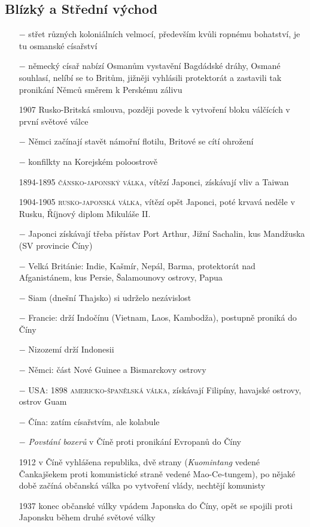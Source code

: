 \documentclass{article}
\begin{document}
\subsection*{Blízký a Střední východ}
\begin{itemize}
    \vspace{-0.5em}
    \setlength\itemsep{0.15em}
    \item[$-$] střet různých koloniálních velmocí, především kvůli ropnému bohatství, je tu osmanské císařství
    \item[$-$] německý císař nabízí Osmanům vystavění Bagdádské dráhy, Osmané souhlasí, nelíbí se to Britům, jižněji vyhlásili protektorát a zastavili tak pronikání Němců směrem k Perskému zálivu
    \item[1907] Rusko-Britská smlouva, později povede k vytvoření bloku válčících v první světové válce
    \item[$-$] Němci začínají stavět námořní flotilu, Britové se cítí ohrožení
    \item[$-$] konfilkty na Korejském poloostrově
    \item[1894-1895] \textsc{čánsko-japonský válka}, vítězí Japonci, získávají vliv a Taiwan
    \item[1904-1905] \textsc{rusko-japonská válka}, vítězí opět Japonci, poté krvavá neděle v Rusku, Říjnový diplom Mikuláše II.
    \item[$-$] Japonci získávají třeba přístav Port Arthur, Jižní Sachalin, kus Mandžuska (SV provincie Číny)
    \item[$-$] Velká Británie: Indie, Kašmír, Nepál, Barma, protektorát nad Afganistánem, kus Persie, Šalamounovy ostrovy, Papua
    \item[$-$] Siam (dnešní Thajsko) si udrželo nezávislost
    \item[$-$] Francie: drží Indočínu (Vietnam, Laos, Kambodža), postupně proniká do Číny
    \item[$-$] Nizozemí drží Indonesii
    \item[$-$] Němci: část Nové Guinee a Bismarckovy ostrovy
    \item[$-$] USA: 1898 \textsc{americko-španělská válka}, získávají Filipíny, havajské ostrovy, ostrov Guam
    \item[$-$] Čína: zatím císařstvím, ale kolabule
    \item[$-$] \textit{Povstání boxerů} v Číně proti pronikání Evropanů do Číny
    \item[1912] v Číně vyhlášena republika, dvě strany (\textit{Kuomintang} vedené Čankajšekem proti komunistické straně vedené Mao-Ce-tungem), po nějaké době začíná občanská válka po vytvoření vlády, nechtějí komunisty
    \item[1937] konec občanské války vpádem Japonska do Číny, opět se spojili proti Japonsku během druhé světové války
\end{itemize}
\end{document}

